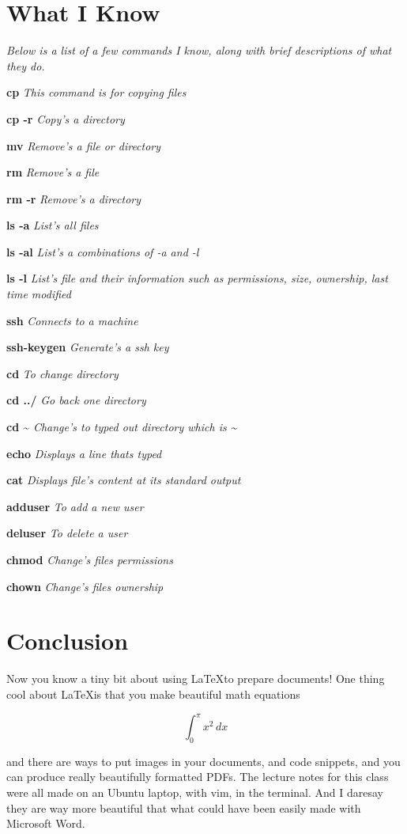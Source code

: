 \documentclass[11pt]{article}
\newcommand{\iknow}[2]{\par\textbf{#1} \textit{#2}}
\begin{document}
\section*{What I Know}

\noindent\textit{Below is a list of a few commands I know, along with brief descriptions of what they do.}
\iknow{cp}{This command is for copying files}
\iknow{cp -r}{Copy's a directory}
\iknow{mv}{Remove's a file or directory}
\iknow{rm}{Remove's a file}
\iknow{rm -r}{Remove's a directory}
\iknow{ls -a}{List's all files}
\iknow{ls -al}{List's a combinations of -a and -l}
\iknow{ls -l}{List's file and their information such as permissions, size, ownership, last time modified}
\iknow{ssh}{Connects to a machine}
\iknow{ssh-keygen}{Generate's a ssh key}
\iknow{cd}{To change directory}
\iknow{cd ../}{Go back one directory}
\iknow{cd \textasciitilde}{Change's to typed out directory which is \textasciitilde}
\iknow{echo}{Displays a line thats typed}
\iknow{cat}{Displays file's content at its standard output}
\iknow{adduser}{To add a new user}
\iknow{deluser}{To delete a user}
\iknow{chmod}{Change's files permissions}
\iknow{chown}{Change's files ownership}

\section*{Conclusion}
Now you know a tiny bit about using \LaTeX to prepare documents! One thing cool about \LaTeX is that you make beautiful math equations

\begin{equation}
\int_{0}^{\pi}x^2\,dx
\end{equation}

and there are ways to put images in your documents, and code snippets, and you can produce really beautifully formatted PDFs. The lecture notes for this class were all made on an Ubuntu laptop, with vim, in the terminal. And I daresay they are way more beautiful that what could have been easily made with Microsoft Word.
\end{document}
